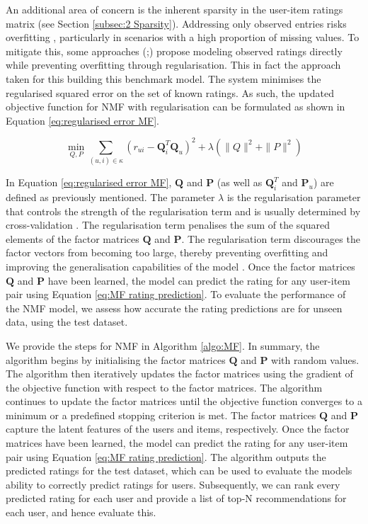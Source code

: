 An additional area of concern is the inherent sparsity in the user-item ratings matrix (see Section \ref{subsec:2 Sparsity}). Addressing only observed entries risks overfitting \cite{koren2009matrix}, particularly in scenarios with a high proportion of missing values. To mitigate this, some approaches (\cite{paterek2007improving};\cite{takacs2007major}) propose modeling observed ratings directly while preventing overfitting through regularisation. This in fact the approach taken for this building this benchmark model. The system minimises the regularised squared error on the set of known ratings. As such, the updated objective function for NMF with regularisation can be formulated as shown in Equation \ref{eq:regularised error MF}.

    \begin{equation}
        \min_{Q, P} \sum_{(u, i) \in \kappa} \left(r_{ui} - \mathbf{Q}^T_i \mathbf{Q}_u\right)^2 + \lambda \left(\|Q\|^2 + \|P\|^2\right)
        \label{eq:regularised error MF}
    \end{equation}
    

In Equation \ref{eq:regularised error MF}, $\mathbf{Q}$ and $\mathbf{P}$ (as well as $\mathbf{Q}^T_i$ and $\mathbf{P}_u$) are defined as previously mentioned. The parameter $\lambda$ is the regularisation parameter that controls the strength of the regularisation term and is usually determined by cross-validation \cite{koren2009matrix}. The regularisation term penalises the sum of the squared elements of the factor matrices $\mathbf{Q}$ and $\mathbf{P}$. The regularisation term discourages the factor vectors from becoming too large, thereby preventing overfitting and improving the generalisation capabilities of the model \cite{koren2009matrix}. Once the factor matrices $\mathbf{Q}$ and $\mathbf{P}$ have been learned, the model can predict the rating for any user-item pair using Equation \ref{eq:MF rating prediction}. To evaluate the performance of the NMF model, we assess how accurate the rating predictions are for unseen data, using the test dataset. 

We provide the steps for NMF in Algorithm \ref{algo:MF}. In summary, the algorithm begins by initialising the factor matrices $\mathbf{Q}$ and $\mathbf{P}$ with random values. The algorithm then iteratively updates the factor matrices using the gradient of the objective function with respect to the factor matrices. The algorithm continues to update the factor matrices until the objective function converges to a minimum or a predefined stopping criterion is met. The factor matrices $\mathbf{Q}$ and $\mathbf{P}$ capture the latent features of the users and items, respectively. Once the factor matrices have been learned, the model can predict the rating for any user-item pair using Equation \ref{eq:MF rating prediction}. The algorithm outputs the predicted ratings for the test dataset, which can be used to evaluate the models ability to correctly predict ratings for users. Subsequently, we can rank every predicted rating for each user and provide a list of top-N recommendations for each user, and hence evaluate this. 

